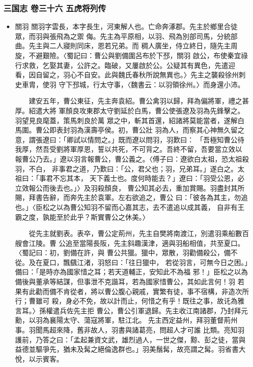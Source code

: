 \documentclass[11pt]{article}
\begin{document}
\subsubsection*{三国志 卷三十六 五虎将列传}
\label{sec:orgheadline215}
\begin{itemize}
\item 關羽
\label{sec:orgheadline210}
關羽字雲長，本字長生，河東解人也。亡命奔涿郡。先主於鄉里合徒眾，而羽與張飛為之禦
侮。先主為平原相，以羽、飛為別部司馬，分統部曲。先主與二人寢則同床，恩若兄弟。而
稠人廣坐，侍立終日，隨先主周旋，不避艱險。〈蜀記曰：曹公與劉備圍呂布於下邳，關羽
啟公，布使秦宜祿行求救，乞娶其妻，公許之。臨破，又屢啟於公。公疑其有異色，先遣迎
看，因自留之，羽心不自安。此與魏氏春秋所說無異也。〉先主之襲殺徐州刺史車胄，使羽
守下邳城，行太守事，〈魏書云：以羽領徐州。〉而身還小沛。

　　建安五年，曹公東征，先主奔袁紹。曹公禽羽以歸，拜為偏將軍，禮之甚厚。紹遣大將
軍顏良攻東郡太守劉延於白馬，曹公使張遼及羽為先鋒擊之。羽望見良麾蓋，策馬刺良於萬
眾之中，斬其首還，紹諸將莫能當者，遂解白馬圍。曹公即表封羽為漢壽亭侯。初，曹公壯
羽為人，而察其心神無久留之意，謂張遼曰：「卿試以情問之。」既而遼以問羽，羽歎曰：
「吾極知曹公待我厚，然吾受劉將軍厚恩，誓以共死，不可背之。吾終不留，吾要當立效以
報曹公乃去。」遼以羽言報曹公，曹公義之。〈傅子曰：遼欲白太祖，恐太祖殺羽，不白，
非事君之道，乃歎曰：「公，君父也；羽，兄弟耳。」遂白之。太祖曰：「事君不忘其本，
天下義士也。度何時能去？」遼曰：「羽受公恩，必立效報公而後去也。」〉及羽殺顏良，
曹公知其必去，重加賞賜。羽盡封其所賜，拜書告辭，而奔先主於袁軍。左右欲追之，曹公
曰：「彼各為其主，勿追也。」〈臣松之以為曹公知羽不留而心嘉其志，去不遣追以成其義，
自非有王霸之度，孰能至於此乎？斯實曹公之休美。〉

　　從先主就劉表。表卒，曹公定荊州，先主自樊將南渡江，別遣羽乘船數百艘會江陵。曹
公追至當陽長阪，先主斜趣漢津，適與羽船相值，共至夏口。〈蜀記曰：初，劉備在許，與
曹公共獵。獵中，眾散，羽勸備殺公，備不從。及在夏口，飄颻江渚，羽怒曰：「往日獵中，
若從羽言，可無今日之困。」備曰：「是時亦為國家惜之耳；若天道輔正，安知此不為福
邪！」臣松之以為備後與董承等結謀，但事泄不克諧耳，若為國家惜曹公，其如此言何！羽
若果有此勸而備不肯從者，將以曹公腹心親戚，實繁有徒，事不宿構，非造次所行；曹雖可
殺，身必不免，故以計而止，何惜之有乎！既往之事，故讬為雅言耳。〉孫權遣兵佐先主拒
曹公，曹公引軍退歸。先主收江南諸郡，乃封拜元勳，以羽為襄陽太守、蕩寇將軍，駐江北。
先主西定益州，拜羽董督荊州事。羽聞馬超來降，舊非故人，羽書與諸葛亮，問超人才可誰
比類。亮知羽護前，乃答之曰：「孟起兼資文武，雄烈過人，一世之傑，黥、彭之徒，當與
益德並驅爭先，猶未及髯之絕倫逸群也。」羽美鬚髯，故亮謂之髯。羽省書大悅，以示賓客。


\end{itemize}
\end{document}
